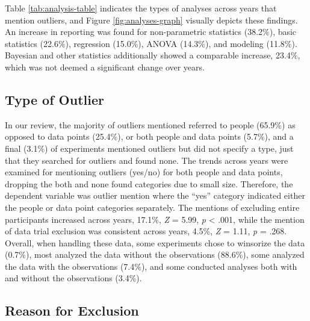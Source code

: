 \documentclass[english,man]{apa6}
\theoremstyle{definition}
\theoremstyle{definition}
\theoremstyle{definition}
\theoremstyle{remark}
\begin{document}
Table \ref{tab:analysis-table} indicates the types of analyses across
years that mention outliers, and Figure \ref{fig:analyses-graph}
visually depicts these findings. An increase in reporting was found for
non-parametric statistics (38.2\%), basic statistics (22.6\%),
regression (15.0\%), ANOVA (14.3\%), and modeling (11.8\%). Bayesian and
other statistics additionally showed a comparable increase, 23.4\%,
which was not deemed a significant change over years.

\subsection{Type of Outlier}\label{type-of-outlier}

In our review, the majority of outliers mentioned referred to people
(65.9\%) as opposed to data points (25.4\%), or both people and data
points (5.7\%), and a final (3.1\%) of experiments mentioned outliers
but did not specify a type, just that they searched for outliers and
found none. The trends across years were examined for mentioning
outliers (yes/no) for both people and data points, dropping the both and
none found categories due to small size. Therefore, the dependent
variable was outlier mention where the \enquote{yes} category indicated
either the people or data point categories separately. The mentions of
excluding entire participants increased across years, 17.1\%, \emph{Z} =
5.99, \emph{p} \textless{} .001, while the mention of data trial
exclusion was consistent across years, 4.5\%, \emph{Z} = 1.11, \emph{p}
= .268. Overall, when handling these data, some experiments chose to
winsorize the data (0.7\%), most analyzed the data without the
observations (88.6\%), some analyzed the data with the observations
(7.4\%), and some conducted analyses both with and without the
observations (3.4\%).

\subsection{Reason for Exclusion}\label{reason-for-exclusion}
\end{document}
